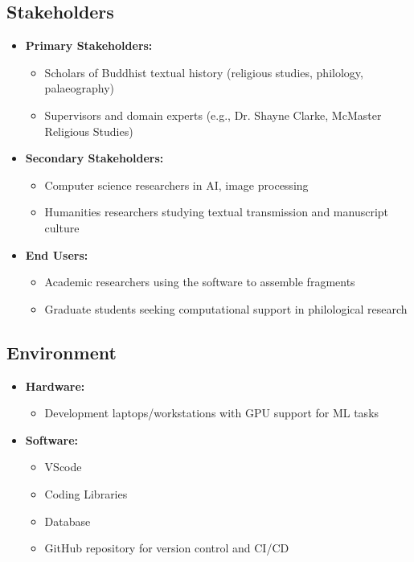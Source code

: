 \documentclass{article}
\begin{document}
\subsection{Stakeholders}
\begin{itemize}
    \item \textbf{Primary Stakeholders:}
    \begin{itemize} 
        \item Scholars of Buddhist textual history (religious studies, philology, palaeography)
        \item Supervisors and domain experts (e.g., Dr. Shayne Clarke, McMaster Religious Studies)
    \end{itemize}

    \item \textbf{Secondary Stakeholders:}
    \begin{itemize} 
        \item Computer science researchers in AI, image processing
        \item Humanities researchers studying textual transmission and manuscript culture

    \end{itemize}
    
    \item \textbf{End Users:}
    \begin{itemize} 
        \item Academic researchers using the software to assemble fragments
        \item Graduate students seeking computational support in philological research
    \end{itemize}
\end{itemize}

\subsection{Environment}
\begin{itemize}
    \item \textbf{Hardware:}
    \begin{itemize} 
        \item Development laptops/workstations with GPU support for ML tasks
    \end{itemize}

    \item \textbf{Software:}
    \begin{itemize} 
        \item VScode
        \item Coding Libraries
        \item Database
        \item GitHub repository for version control and CI/CD
    \end{itemize}
\end{itemize}
\end{document}
